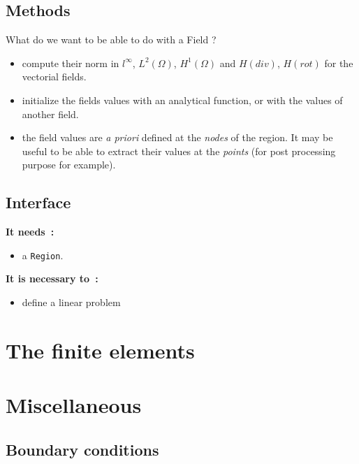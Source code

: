 \documentclass{article}
\begin{document}
\subsection{Methods}
What do we want to be able to do with a Field ? 
\begin{itemize}
\item compute their norm in $l^\infty$, $L^2(\Omega)$, $H^1(\Omega)$ and
  $H(div)$, $H(rot)$ for the vectorial fields. 
\item initialize the fields values with an analytical function, or with
  the values of another field.
\item the field values are \emph{a priori} defined at the
  \emph{nodes} of the region. It may be useful to be able to extract
  their values at the \emph{points} (for post processing purpose for example).
\end{itemize}

\subsection{Interface}
\textbf{It needs~:}
\begin{itemize}
\item a \texttt{Region}.
\end{itemize}

\textbf{It is necessary to~:}
\begin{itemize}
\item define a linear problem
\end{itemize}

\section{The finite elements}


\section{Miscellaneous}

\subsection{Boundary conditions}
\end{document}
